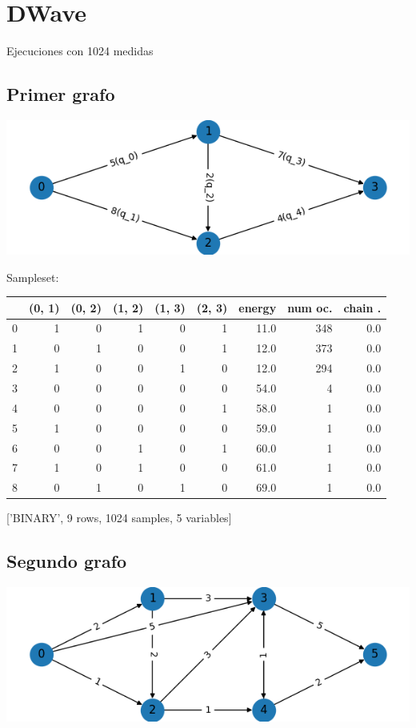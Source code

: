 \documentclass[letterpaper]{article}
\begin{document}
\newpage
\section{DWave}
\label{sec:org2aeb021}
Ejecuciones con 1024 medidas
\subsection{Primer grafo}
\label{sec:org9e11ab6}
\begin{center}
\includegraphics[width=.9\linewidth]{./img/primer_grafo/primer_grafo.png}
\end{center}

Sampleset:
\begin{center}
\begin{tabular}{|r|r|r|r|r|r|r|r|r|}
\hline
 & (0, 1) & (0, 2) & (1, 2) & (1, 3) & (2, 3) & energy & num oc. & chain .\\
\hline
0 & 1 & 0 & 1 & 0 & 1 & 11.0 & 348 & 0.0\\
1 & 0 & 1 & 0 & 0 & 1 & 12.0 & 373 & 0.0\\
2 & 1 & 0 & 0 & 1 & 0 & 12.0 & 294 & 0.0\\
3 & 0 & 0 & 0 & 0 & 0 & 54.0 & 4 & 0.0\\
4 & 0 & 0 & 0 & 0 & 1 & 58.0 & 1 & 0.0\\
5 & 1 & 0 & 0 & 0 & 0 & 59.0 & 1 & 0.0\\
6 & 0 & 0 & 1 & 0 & 1 & 60.0 & 1 & 0.0\\
7 & 1 & 0 & 1 & 0 & 0 & 61.0 & 1 & 0.0\\
8 & 0 & 1 & 0 & 1 & 0 & 69.0 & 1 & 0.0\\
\hline
\end{tabular}
\end{center}
['BINARY', 9 rows, 1024 samples, 5 variables]

\newpage
\subsection{Segundo grafo}
\label{sec:org635e51d}
\begin{center}
\includegraphics[width=.9\linewidth]{./img/segundo_grafo.png}
\end{center}
\end{document}
